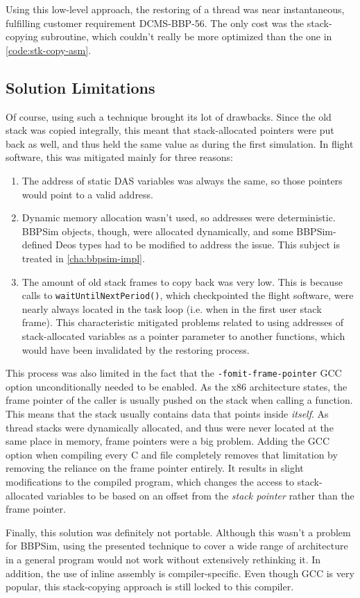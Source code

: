Using this low-level approach, the restoring of a thread was near instantaneous, fulfilling customer requirement DCMS-BBP-56. The only cost was the stack-copying subroutine, which couldn't really be more optimized than the one in \autoref{code:stk-copy-asm}.

\subsection*{Solution Limitations}
Of course, using such a technique brought its lot of drawbacks. Since the old stack was copied integrally, this meant that stack-allocated pointers were put back as well, and thus held the same value as during the first simulation. In flight software, this was mitigated mainly for three reasons: 
\begin{enumerate}
	\item The address of static DAS variables was always the same, so those pointers would point to a valid address.
	\item Dynamic memory allocation wasn't used, so addresses were deterministic. BBPSim objects, though, were allocated dynamically, and some BBPSim-defined Deos types had to be modified to address the issue. This subject is treated in \autoref{cha:bbpsim-impl}. 
	\item The amount of old stack frames to copy back was very low. This is because calls to \texttt{waitUntilNextPeriod()}, which checkpointed the flight software, were nearly always located in the task loop (i.e. when in the first user stack frame). This characteristic mitigated problems related to using addresses of stack-allocated variables as a pointer parameter to another functions, which would have been invalidated by the restoring process. 
\end{enumerate}

This process was also limited in the fact that the \texttt{-fomit-frame-pointer} GCC option unconditionally needed to be enabled. As the x86 architecture states, the frame pointer of the caller is usually pushed on the stack when calling a function\cite{online:x86-abi}. This means that the stack usually contains data that points inside \textit{itself}. As thread stacks were dynamically allocated, and thus were never located at the same place in memory, frame pointers were a big problem. Adding the GCC option when compiling every C and \Cpp file completely removes that limitation by removing the reliance on the frame pointer entirely. It results in slight modifications to the compiled program, which changes the access to stack-allocated variables to be based on an offset from the \textit{stack pointer} rather than the frame pointer\cite{online:omit-frame-pointer}.

Finally, this solution was definitely not portable. Although this wasn't a problem for BBPSim, using the presented technique to cover a wide range of architecture in a general program would not work without extensively rethinking it. In addition, the use of inline assembly is compiler-specific. Even though GCC is very popular, this stack-copying approach is still locked to this compiler. 

